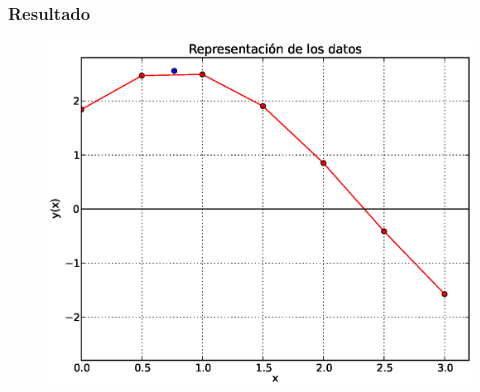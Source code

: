 \begin{frame}
\frametitle{Resultado}
\begin{figure}
	\centering
	\includegraphics[scale=0.45]{Imagenes/Tarea_Raices_Problema_3_02.eps} 
\end{figure}
\end{frame}
